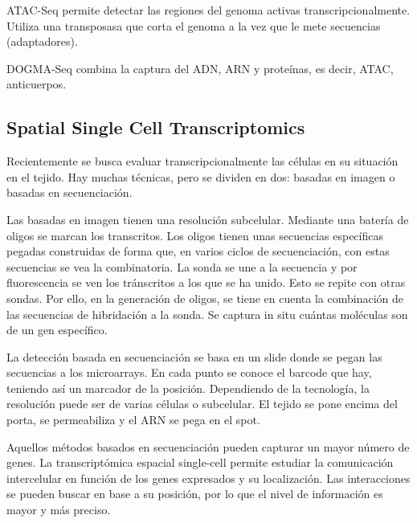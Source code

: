 ATAC-Seq permite detectar las regiones del genoma activas transcripcionalmente. Utiliza una transposasa que corta el genoma a la vez que le mete secuencias (adaptadores). 

DOGMA-Seq combina la captura del ADN, ARN y proteínas, es decir, ATAC, anticuerpos. 

\subsection{Spatial Single Cell Transcriptomics}
Recientemente se busca evaluar transcripcionalmente las células en su situación en el tejido. Hay muchas técnicas, pero se dividen en dos: basadas en imagen o basadas en secuenciación.

Las basadas en imagen tienen una resolución subcelular. Mediante una batería de oligos se marcan los transcritos. Los oligos tienen unas secuencias específicas pegadas construidas de forma que, en varios ciclos de secuenciación, con estas secuencias se vea la combinatoria. La sonda se une a la secuencia y por fluorescencia se ven los tránscritos a los que se ha unido. Esto se repite con otras sondas. Por ello, en la generación de oligos, se tiene en cuenta la combinación de las secuencias de hibridación a la sonda. Se captura in situ cuántas moléculas son de un gen específico. 

La detección basada en secuenciación se basa en un slide donde se pegan las secuencias a los microarrays. En cada punto se conoce el barcode que hay, teniendo así un marcador de la posición. Dependiendo de la tecnología, la resolución puede ser de varias células o subcelular. El tejido se pone encima del porta, se permeabiliza y el ARN se pega en el spot. 

Aquellos métodos basados en secuenciación pueden capturar un mayor número de genes. La transcriptómica espacial single-cell permite estudiar la comunicación intercelular en función de los genes expresados y su localización. Las interacciones se pueden buscar en base a su posición, por lo que el nivel de información es mayor y más preciso. 






